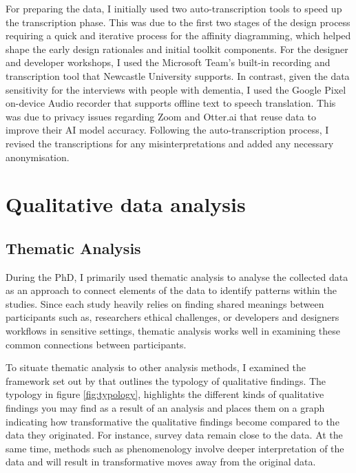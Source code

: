 For preparing the data, I initially used two auto-transcription tools to speed up the transcription phase. This was due to the first two stages of the design process requiring a quick and iterative process for the affinity diagramming, which helped shape the early design rationales and initial toolkit components. For the designer and developer workshops, I used the Microsoft Team's built-in recording and transcription tool that Newcastle University supports. In contrast, given the data sensitivity for the interviews with people with dementia, I used the Google Pixel on-device Audio recorder that supports offline text to speech translation. This was due to privacy issues regarding Zoom and Otter.ai that reuse data to improve their AI model accuracy. Following the auto-transcription process, I revised the transcriptions for any misinterpretations and added any necessary anonymisation. 

\section{Qualitative data analysis}
\label{QualDataAnalysis}

\subsection{Thematic Analysis}
\label{TA}
During the PhD, I primarily used thematic analysis to analyse the collected data as an approach to connect elements of the data to identify patterns within the studies. Since each study heavily relies on finding shared meanings between participants such as, researchers ethical challenges, or developers and designers workflows in sensitive settings, thematic analysis works well in examining these common connections between participants. 

To situate thematic analysis to other analysis methods, I examined the framework set out by \cite{sandelowski2003classifying} that outlines the typology of qualitative findings. The typology in figure \ref{fig:typology}, highlights the different kinds of qualitative findings you may find as a result of an analysis and places them on a graph indicating how transformative the qualitative findings become compared to the data they originated. For instance, survey data remain close to the data. At the same time, methods such as phenomenology involve deeper interpretation of the data and will result in transformative moves away from the original data.


